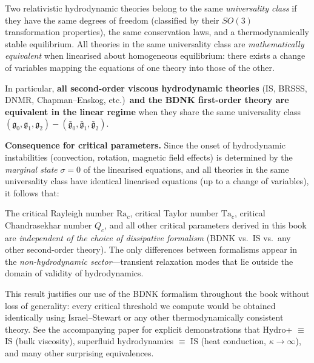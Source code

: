 \begin{tcolorbox}[colback=green!5!white, colframe=green!50!black,
  title={\textbf{Universality Theorem (Gavassino, Disconzi \& Noronha
    2023)}},
  fonttitle=\bfseries]
\label{thm:universality}
Two relativistic hydrodynamic theories belong to the same
\emph{universality class} if they have the same degrees of freedom
(classified by their $SO(3)$ transformation properties), the same
conservation laws, and a thermodynamically stable equilibrium.  All
theories in the same universality class are \emph{mathematically
equivalent} when linearised about homogeneous equilibrium: there
exists a change of variables mapping the equations of one theory
into those of the other.

In particular, \textbf{all second-order viscous hydrodynamic theories}
(IS, BRSSS, DNMR, Chapman--Enskog, etc.)\ \textbf{and the BDNK
first-order theory are equivalent in the linear regime} when they
share the same universality class
$(\mathfrak{g}_{0},\mathfrak{g}_{1},\mathfrak{g}_{2})
-(\bar{\mathfrak{g}}_{0},\bar{\mathfrak{g}}_{1},
\bar{\mathfrak{g}}_{2})$.
\end{tcolorbox}

\noindent
\textbf{Consequence for critical parameters.}
Since the onset of hydrodynamic instabilities (convection, rotation,
magnetic field effects) is determined by the \emph{marginal state}
$\sigma = 0$ of the linearised equations, and all theories in the same
universality class have identical linearised equations (up to a change
of variables), it follows that:

\begin{tcolorbox}[colback=blue!5!white, colframe=blue!50!black,
  title={\textbf{Formalism-Independence of Critical Parameters}},
  fonttitle=\bfseries]
\label{box:formalism-independence}
The critical Rayleigh number $\mathrm{Ra}_{c}$, critical Taylor
number $\mathrm{Ta}_{c}$, critical Chandrasekhar number $Q_{c}$, and
all other critical parameters derived in this book are
\emph{independent of the choice of dissipative formalism} (BDNK vs.\
IS vs.\ any other second-order theory).  The only differences between
formalisms appear in the \emph{non-hydrodynamic sector}---transient
relaxation modes that lie outside the domain of validity of
hydrodynamics.
\end{tcolorbox}

\noindent
This result justifies our use of the BDNK formalism throughout the
book without loss of generality: every critical threshold we compute
would be obtained identically using Israel--Stewart or any other
thermodynamically consistent theory.  See the accompanying paper
\citep{GavassinoUniversality2} for explicit demonstrations that
Hydro+ $\equiv$ IS (bulk viscosity), superfluid hydrodynamics
$\equiv$ IS (heat conduction, $\kappa \to \infty$), and many other
surprising equivalences.


